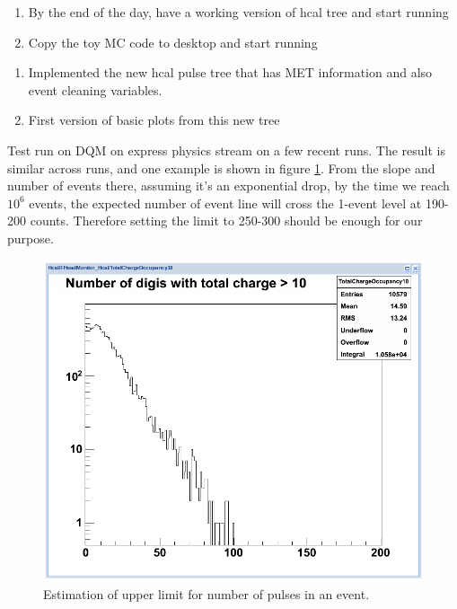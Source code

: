

\begin{enumerate}
\item By the end of the day, have a working version of hcal tree and start running
\item Copy the toy MC code to desktop and start running
\end{enumerate}


\begin{enumerate}
\item Implemented the new hcal pulse tree that has MET information and also event cleaning variables.
\item First version of basic plots from this new tree
\end{enumerate}


Test run on DQM on express physics stream on a few recent runs.
The result is similar across runs, and one example is shown in figure \ref{Figure_6333NumberOfPulseAbove10fC}.
From the slope and number of events there, assuming it's an exponential drop, by the time we reach $10^6$ events,
the expected number of event line will cross the 1-event level at 190-200 counts.
Therefore setting the limit to 250-300 should be enough for our purpose.

\begin{figure}
   \includegraphics[width=120mm]{DailyLog/6333/6333NumberOfPulseAbove10fC.png}
   \caption{Estimation of upper limit for number of pulses in an event.}
   \label{Figure_6333NumberOfPulseAbove10fC}
\end{figure}

